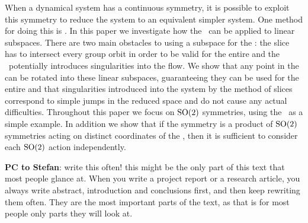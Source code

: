 
When a dynamical system has a continuous symmetry, it is possible to
exploit this symmetry to reduce the system to an equivalent simpler
system. One method for doing this is \mslices. In this paper we
investigate how the \mslices\ can be applied to linear subspaces. There
are two main obstacles to using a subspace for the \mslices: the slice
has to intersect every group orbit in order to be valid for the entire
{\statesp} and the \mslices\ potentially introduces singularities into
the flow. We show that any point in the {\statesp} can be rotated into
these linear subspaces, guaranteeing they can be used for the entire
{\statesp} and that singularities introduced into the system by the
method of slices correspond to simple jumps in the reduced space and do
not cause any actual difficulties. Throughout this paper we focus on
$\textrm{SO}(2)$ symmetries, using the \cLe\ as a simple example. In addition we
show that if the symmetry is a product of $\textrm{SO}(2)$ symmetries acting on
distinct coordinates of the {\statesp}, then it is sufficient to consider
each $\textrm{SO}(2)$ action independently.


\ifboyscout
    {\color{red} {\bf PC to Stefan}:
write this  often! this might be the only part of this text that most
people glance at.
%
%
   When you write a project report or a research article, you always
   write abstract, introduction and conclusions first, and then keep
   rewriting them often. They are the most important parts of the text,
   as that is for most people only parts they will look at.
   }
\else
\fi


%
